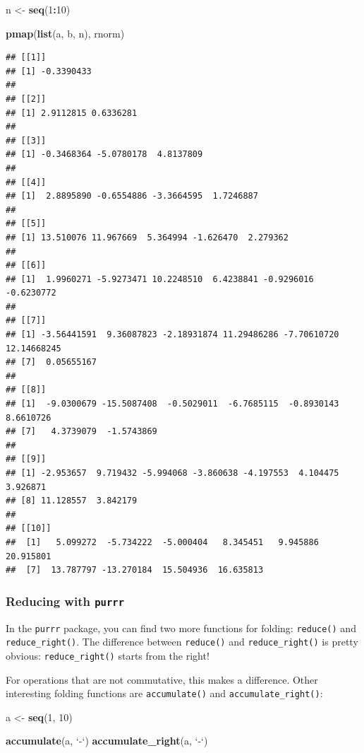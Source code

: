 \documentclass[]{gitbook}
\newenvironment{Shaded}{\begin{snugshade}}{\end{snugshade}}
\newcommand{\DataTypeTok}[1]{\textcolor[rgb]{0.13,0.29,0.53}{#1}}
\newcommand{\DecValTok}[1]{\textcolor[rgb]{0.00,0.00,0.81}{#1}}
\newcommand{\KeywordTok}[1]{\textcolor[rgb]{0.13,0.29,0.53}{\textbf{#1}}}
\newcommand{\NormalTok}[1]{#1}
\newcommand{\OperatorTok}[1]{\textcolor[rgb]{0.81,0.36,0.00}{\textbf{#1}}}
\newcommand{\StringTok}[1]{\textcolor[rgb]{0.31,0.60,0.02}{#1}}
\begin{document}
\begin{Shaded}
\begin{Highlighting}[]
\NormalTok{n <-}\StringTok{ }\KeywordTok{seq}\NormalTok{(}\DecValTok{1}\OperatorTok{:}\DecValTok{10}\NormalTok{)}

\KeywordTok{pmap}\NormalTok{(}\KeywordTok{list}\NormalTok{(a, b, n), rnorm)}
\end{Highlighting}
\end{Shaded}

\begin{verbatim}
## [[1]]
## [1] -0.3390433
## 
## [[2]]
## [1] 2.9112815 0.6336281
## 
## [[3]]
## [1] -0.3468364 -5.0780178  4.8137809
## 
## [[4]]
## [1]  2.8895890 -0.6554886 -3.3664595  1.7246887
## 
## [[5]]
## [1] 13.510076 11.967669  5.364994 -1.626470  2.279362
## 
## [[6]]
## [1]  1.9960271 -5.9273471 10.2248510  6.4238841 -0.9296016 -0.6230772
## 
## [[7]]
## [1] -3.56441591  9.36087823 -2.18931874 11.29486286 -7.70610720 12.14668245
## [7]  0.05655167
## 
## [[8]]
## [1]  -9.0300679 -15.5087408  -0.5029011  -6.7685115  -0.8930143   8.6610726
## [7]   4.3739079  -1.5743869
## 
## [[9]]
## [1] -2.953657  9.719432 -5.994068 -3.860638 -4.197553  4.104475  3.926871
## [8] 11.128557  3.842179
## 
## [[10]]
##  [1]   5.099272  -5.734222  -5.000404   8.345451   9.945886  20.915801
##  [7]  13.787797 -13.270184  15.504936  16.635813
\end{verbatim}

\hypertarget{reducing-with-purrr}{%
\subsubsection{\texorpdfstring{Reducing with \texttt{purrr}}{Reducing with purrr}}\label{reducing-with-purrr}}

In the \texttt{purrr} package, you can find two more functions for folding: \texttt{reduce()} and
\texttt{reduce\_right()}. The difference between \texttt{reduce()} and \texttt{reduce\_right()} is pretty obvious:
\texttt{reduce\_right()} starts from the right!

For operations that are not commutative, this makes a difference. Other interesting folding
functions are \texttt{accumulate()} and \texttt{accumulate\_right()}:

\begin{Shaded}
\begin{Highlighting}[]
\NormalTok{a <-}\StringTok{ }\KeywordTok{seq}\NormalTok{(}\DecValTok{1}\NormalTok{, }\DecValTok{10}\NormalTok{)}

\KeywordTok{accumulate}\NormalTok{(a, }\StringTok{`}\DataTypeTok{-}\StringTok{`}\NormalTok{)}
\KeywordTok{accumulate_right}\NormalTok{(a, }\StringTok{`}\DataTypeTok{-}\StringTok{`}\NormalTok{)}
\end{Highlighting}
\end{Shaded}
\end{document}
